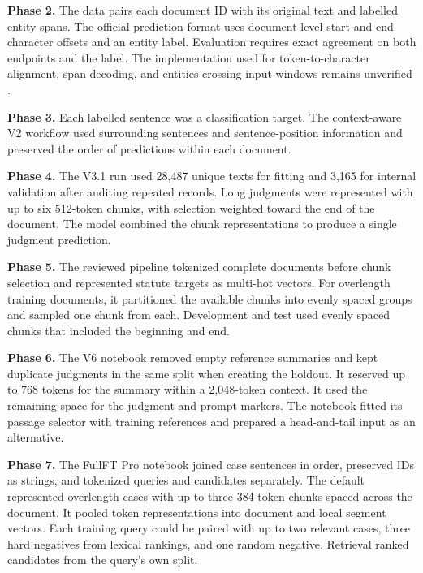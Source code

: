 \textbf{Phase 2.} The data pairs each document ID with its original text
and labelled entity spans. The official prediction format uses
document-level start and end character offsets and an entity label.
Evaluation requires exact agreement on both endpoints and the label. The
implementation used for token-to-character alignment, span decoding, and
entities crossing input windows remains unverified \cite{cs781_brief}.

\textbf{Phase 3.} Each labelled sentence was a classification target.
The context-aware V2 workflow used surrounding sentences and
sentence-position information and preserved the order of predictions
within each document.

\textbf{Phase 4.} The V3.1 run used 28,487 unique texts for fitting and
3,165 for internal validation after auditing repeated records. Long
judgments were represented with up to six 512-token chunks, with
selection weighted toward the end of the document. The model combined
the chunk representations to produce a single judgment prediction.

\textbf{Phase 5.} The reviewed pipeline tokenized complete documents
before chunk selection and represented statute targets as multi-hot
vectors. For overlength training documents, it partitioned the available
chunks into evenly spaced groups and sampled one chunk from each.
Development and test used evenly spaced chunks that included the
beginning and end.

\textbf{Phase 6.} The V6 notebook removed empty reference summaries and
kept duplicate judgments in the same split when creating the holdout. It
reserved up to 768 tokens for the summary within a 2,048-token context.
It used the remaining space for the judgment and prompt markers. The
notebook fitted its passage selector with training references and
prepared a head-and-tail input as an alternative.

\textbf{Phase 7.} The FullFT Pro notebook joined case sentences in
order, preserved IDs as strings, and tokenized queries and candidates
separately. The default represented overlength cases with up to three
384-token chunks spaced across the document. It pooled token
representations into document and local segment vectors. Each training
query could be paired with up to two relevant cases, three hard
negatives from lexical rankings, and one random negative. Retrieval
ranked candidates from the query's own split.
